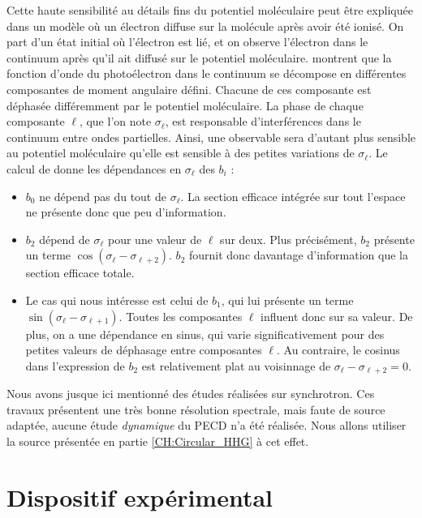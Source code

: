 Cette haute sensibilité au détails fins du potentiel moléculaire peut être expliquée dans un modèle où un électron diffuse sur la molécule après avoir été ionisé. On part d'un état initial où l'électron est lié, et on observe l'électron dans le continuum après qu'il ait diffusé sur le potentiel moléculaire.  montrent que la fonction d'onde du photoélectron dans le continuum se décompose en différentes composantes de moment angulaire défini. Chacune de ces composante est déphasée différemment par le potentiel moléculaire. La phase de chaque composante $\ell$, que l'on note $\sigma_\ell$, est responsable d'interférences dans le continuum entre ondes partielles. Ainsi, une observable sera d'autant plus sensible au potentiel moléculaire qu'elle est sensible à des petites variations de $\sigma_\ell$. Le calcul de  donne les dépendances en $\sigma_\ell$ des $b_i$ :

\begin{itemize}
\renewcommand{\labelitemi}{$\bullet$}
\setlength\itemsep{1em}
\item $b_0$ ne dépend pas du tout de $\sigma_\ell$. La section efficace intégrée sur tout l'espace ne présente donc que peu d'information.
\item $b_2$ dépend de $\sigma_\ell$ pour une valeur de $\ell$ sur deux. Plus précisément, $b_2$ présente un terme $\cos(\sigma_\ell-\sigma_{\ell+2})$. $b_2$ fournit donc davantage d'information que la section efficace totale.
\item Le cas qui nous intéresse est celui de $b_1$, qui lui présente un terme $\sin(\sigma_\ell-\sigma_{\ell+1})$. Toutes les composantes $\ell$ influent donc sur sa valeur. De plus, on a une dépendance en sinus, qui varie significativement pour des petites valeurs de déphasage entre composantes $\ell$. Au contraire, le cosinus dans l'expression de $b_2$ est relativement plat au voisinnage de $\sigma_\ell-\sigma_{\ell+2} = 0$.
\end{itemize}

Nous avons jusque ici mentionné des études réalisées sur synchrotron. Ces travaux présentent une très bonne résolution spectrale, mais faute de source adaptée, aucune étude \textit{dynamique} du PECD n'a été réalisée. Nous allons utiliser la source présentée en partie \ref{CH:Circular_HHG} à cet effet.
%
\section{Dispositif expérimental}
